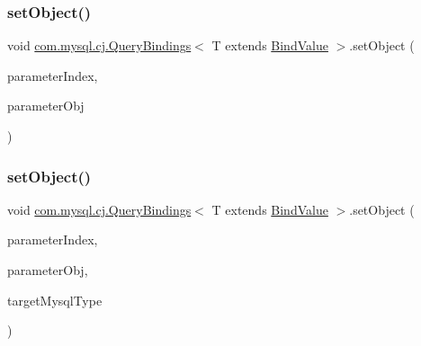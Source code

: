 \mbox{\label{interfacecom_1_1mysql_1_1cj_1_1_query_bindings_a59506654eef36f22e6852427e623b605}} 
\subsubsection{\texorpdfstring{set\+Object()}{setObject()}\hspace{0.1cm}{\footnotesize\ttfamily [1/3]}}
{\footnotesize\ttfamily void \mbox{\hyperlink{interfacecom_1_1mysql_1_1cj_1_1_query_bindings}{com.\+mysql.\+cj.\+Query\+Bindings}}$<$ T extends \mbox{\hyperlink{interfacecom_1_1mysql_1_1cj_1_1_bind_value}{Bind\+Value}} $>$.set\+Object (\begin{DoxyParamCaption}\item[{int}]{parameter\+Index,  }\item[{Object}]{parameter\+Obj }\end{DoxyParamCaption})}

\mbox{\label{interfacecom_1_1mysql_1_1cj_1_1_query_bindings_a32037607b59f8c4a04eb3051763d0f9a}} 
\subsubsection{\texorpdfstring{set\+Object()}{setObject()}\hspace{0.1cm}{\footnotesize\ttfamily [2/3]}}
{\footnotesize\ttfamily void \mbox{\hyperlink{interfacecom_1_1mysql_1_1cj_1_1_query_bindings}{com.\+mysql.\+cj.\+Query\+Bindings}}$<$ T extends \mbox{\hyperlink{interfacecom_1_1mysql_1_1cj_1_1_bind_value}{Bind\+Value}} $>$.set\+Object (\begin{DoxyParamCaption}\item[{int}]{parameter\+Index,  }\item[{Object}]{parameter\+Obj,  }\item[{\mbox{\hyperlink{enumcom_1_1mysql_1_1cj_1_1_mysql_type}{Mysql\+Type}}}]{target\+Mysql\+Type }\end{DoxyParamCaption})}

